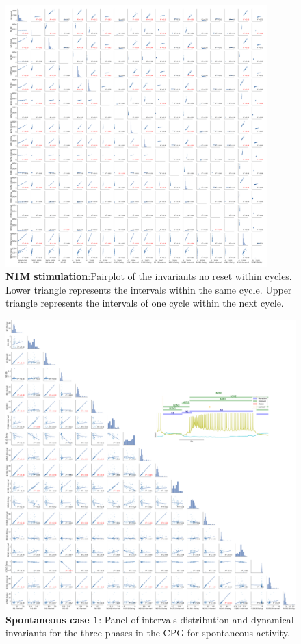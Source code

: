 \begin{figure}[htbp]
	\centering
	\includegraphics[width=0.9\textwidth]{./invariants/data/MODEL/n1m_driven/images/3phases/_output_pairplot_reset.png}
	\caption{\textbf{N1M stimulation}:Pairplot of the invariants no reset within cycles. Lower triangle represents the intervals within the same cycle. Upper triangle represents the intervals of one cycle within the next cycle. }
	\label{fig:N1M stimulation pairplot reset}
\end{figure}

\begin{figure}[htbp]
	\centering
	\includegraphics[width=\textwidth]{./img/invariants/data/SUSSEX/prep2/images/3phases/panel_with_pairplot.png}
	\caption{\textbf{Spontaneous case 1}: Panel of intervals distribution and dynamical invariants for the three phases in the CPG for spontaneous activity.}
	\label{fig:prep2 invariants pairplot}
\end{figure}



